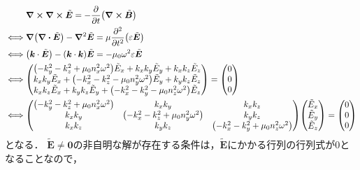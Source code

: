 \documentclass{report}
\begin{document}
    \begin{align}
      &\curl\curl\tilde{\bm{E}} = -\pdv{t}\qty(\curl\tilde{\bm{B}}) \\ 
      \iff &\grad\qty(\div\tilde{\bm{E}}) - \laplacian\tilde{\bm{E}} = \mu\pdv[2]{t}\qty(\epsilon\tilde{\bm{E}}) \\ 
      \iff &\qty(\bm{k}\cdot \tilde{\bm{E}}) - (\bm{k}\cdot \bm{k})\tilde{\bm{E}} = -\mu_0\omega^2\epsilon\tilde{\bm{E}} \\ 
      \iff &\mqty(
        \qty(-k^2_y - k^2_z + \mu_0n^2_x\omega^2)\tilde{E}_x + k_xk_y\tilde{E}_y + k_xk_z\tilde{E}_z \\ 
        k_xk_y\tilde{E}_x + \qty(-k^2_x - k^2_z - \mu_0n^2_y\omega^2)\tilde{E}_y + k_yk_z\tilde{E}_z \\ 
        k_xk_z\tilde{E}_x + k_yk_z\tilde{E}_y + \qty(-k^2_x - k^2_y - \mu_0n^2_z\omega^2)\tilde{E}_z \\ 
      ) = \mqty(0 \\ 0 \\ 0) \\ 
      \iff &\mqty(
        \qty(-k^2_y - k^2_z + \mu_0n^2_x\omega^2) & k_xk_y & k_xk_z \\ 
        k_xk_y & \qty(-k^2_x - k^2_z + \mu_0n^2_y\omega^2) & k_yk_z \\ 
        k_xk_z &  k_yk_z & \qty(-k^2_x - k^2_y + \mu_0n^2_z\omega^2) \\ 
      )\mqty(\tilde{E}_x \\ \tilde{E}_y \\ \tilde{E}_z) = \mqty(0 \\ 0 \\ 0) \label{epsilon-matrix}
    \end{align}
    となる．
    $\tilde{\bm{E}} \neq \bm{0}$の非自明な解が存在する条件は，$\tilde{\bm{E}}$にかかる行列の行列式が0となることなので，
\end{document}
